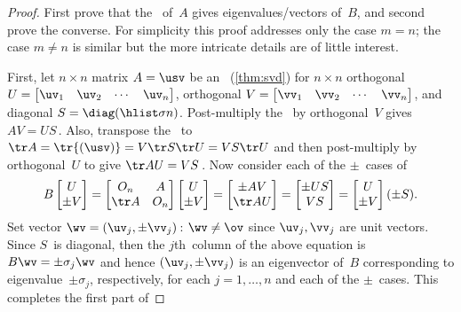 \begin{proof} 
First prove that the \svd\ of~\(A\) gives eigenvalues\slash vectors of~\(B\), and second prove the converse.
For simplicity this proof addresses only the case \(m=n\); the case \(m\neq n\) is similar but the more intricate details are of little interest.

First, let \(n\times n\) matrix \(A=\usv\) be an \svd\ (\cref{thm:svd}) for \(n\times n\) orthogonal \(U=\begin{bmatrix} \uv_1&\uv_2&\cdots&\uv_n \end{bmatrix}\),  orthogonal \(V=\begin{bmatrix} \vv_1&\vv_2&\cdots&\vv_n \end{bmatrix}\), and diagonal \(S=\diag(\hlist\sigma n)\).
Post-multiply the \svd\ by orthogonal~\(V\) gives \(AV=US\)\,.
Also, transpose the \svd\ to \(\tr A=\tr{(\usv)}=V\tr S\tr U=VS\tr U\) and then post-multiply by orthogonal~\(U\) to give \(\tr AU=VS\)\,.
Now consider each of the \(\pm\)~cases of
\begin{equation*}
B\begin{bmatrix} U\\\pm V \end{bmatrix}
=\begin{bmatrix} O_n&A\\\tr A&O_n \end{bmatrix}\begin{bmatrix} U\\\pm V \end{bmatrix}
=\begin{bmatrix} \pm AV\\\tr AU \end{bmatrix}
=\begin{bmatrix} \pm US\\VS \end{bmatrix}
=\begin{bmatrix} U\\\pm V \end{bmatrix}(\pm S).
\end{equation*}
Set vector \(\wv=(\uv_j,\pm\vv_j)\)\,: \(\wv\neq\ov\) since \(\uv_j,\vv_j\) are unit vectors.  
Since \(S\)~is diagonal, then the \(j\)th~column of the above equation is \(B\wv=\pm\sigma_j\wv\) and hence \((\uv_j,\pm\vv_j)\) is an eigenvector of~\(B\) corresponding to eigenvalue~\(\pm\sigma_j\), respectively, for each \(j=1,\ldots,n\) and each of the \(\pm\)~cases.
This completes the first part of 


\end{proof}
